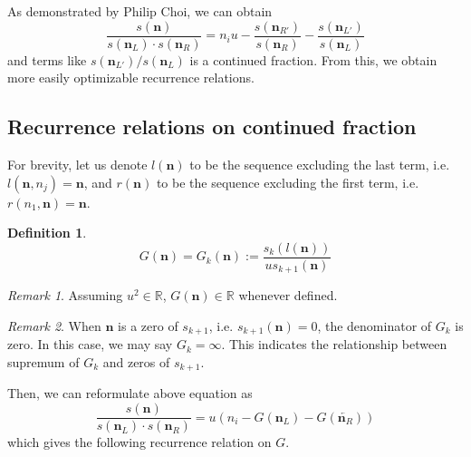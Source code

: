 \documentclass{article}
\theoremstyle{definition}
\newtheorem*{definition}{Definition}
\theoremstyle{plain}
\theoremstyle{remark}
\newtheorem*{remark}{Remark}
\numberwithin{equation}{section}
\newcommand{\real}{\mathbb{R}}
\begin{document}
As demonstrated by Philip Choi, we can obtain
\[
  \frac{s(\mathbf{n})}{s(\mathbf{n}_L) \cdot s(\mathbf{n}_R)}
  = n_i u - \frac{s(\mathbf{n}_{R'})}{s(\mathbf{n}_R)} - \frac{s(\mathbf{n}_{L'})}{s(\mathbf{n}_L)}
\]
and terms like $s(\mathbf{n}_{L'}) / s(\mathbf{n}_L)$ is a continued fraction.
From this, we obtain more easily optimizable recurrence relations.

\subsection{Recurrence relations on continued fraction}

\let\rev\overleftarrow

For brevity, let us denote $l(\mathbf{n})$ to be the sequence excluding the last term,
i.e. $l(\mathbf{n}, n_j) = \mathbf{n}$,
and $r(\mathbf{n})$ to be the sequence excluding the first term,
i.e. $r(n_1, \mathbf{n}) = \mathbf{n}$.

\begin{definition}
  \[ G(\mathbf{n}) = G_k(\mathbf{n}) := \frac{s_k(l(\mathbf{n}))}{u s_{k+1}(\mathbf{n})} \]
\end{definition}

\begin{remark}
  Assuming $u^2 \in \real$, $G(\mathbf{n}) \in \real$ whenever defined.
\end{remark}

\begin{remark}
  When $\mathbf{n}$ is a zero of $s_{k+1}$, i.e. $s_{k+1}(\mathbf{n}) = 0$,
  the denominator of $G_k$ is zero. In this case, we may say $G_k = \infty$.
  This indicates the relationship between supremum of $G_k$ and zeros of $s_{k+1}$.
\end{remark}

Then, we can reformulate above equation as
\begin{equation}\label{chebyshev_and_fraction}
  \frac{s(\mathbf{n})}{s(\mathbf{n}_L) \cdot s(\mathbf{n}_R)}
  = u (n_i - G(\mathbf{n}_L) - G(\overleftarrow{\mathbf{n}_R}))
\end{equation}
which gives the following recurrence relation on $G$.

\def\ns {\mathbf{n}}
\def\nsL {\mathbf{n}_L}
\def\nsR {\mathbf{n}_R}
\def\nsLl {\mathbf{n}_{L'}}
\def\nsRr {\mathbf{n}_{R'}}
\end{document}
